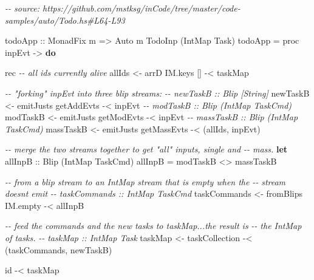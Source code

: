 \documentclass[]{article}
\newenvironment{Shaded}{}{}
\newcommand{\CommentTok}[1]{\textcolor[rgb]{0.38,0.63,0.69}{\textit{#1}}}
\newcommand{\DataTypeTok}[1]{\textcolor[rgb]{0.56,0.13,0.00}{#1}}
\newcommand{\FunctionTok}[1]{\textcolor[rgb]{0.02,0.16,0.49}{#1}}
\newcommand{\KeywordTok}[1]{\textcolor[rgb]{0.00,0.44,0.13}{\textbf{#1}}}
\newcommand{\NormalTok}[1]{#1}
\newcommand{\OperatorTok}[1]{\textcolor[rgb]{0.40,0.40,0.40}{#1}}
\newcommand{\OtherTok}[1]{\textcolor[rgb]{0.00,0.44,0.13}{#1}}
\begin{document}
\begin{Shaded}
\begin{Highlighting}[]
\CommentTok{{-}{-} source: https://github.com/mstksg/inCode/tree/master/code{-}samples/auto/Todo.hs\#L64{-}L93}

\OtherTok{todoApp ::} \DataTypeTok{MonadFix}\NormalTok{ m }\OtherTok{=\textgreater{}} \DataTypeTok{Auto}\NormalTok{ m }\DataTypeTok{TodoInp}\NormalTok{ (}\DataTypeTok{IntMap} \DataTypeTok{Task}\NormalTok{)}
\NormalTok{todoApp }\OtherTok{=}\NormalTok{ proc inpEvt }\OtherTok{{-}\textgreater{}} \KeywordTok{do}

\NormalTok{    rec }\CommentTok{{-}{-} all id\textquotesingle{}s currently alive}
\NormalTok{        allIds }\OtherTok{\textless{}{-}}\NormalTok{ arrD IM.keys [] }\OperatorTok{{-}\textless{}}\NormalTok{ taskMap}

        \CommentTok{{-}{-} "forking" \textasciigrave{}inpEvt\textasciigrave{} into three blip streams:}
        \CommentTok{{-}{-} newTaskB :: Blip [String]}
\NormalTok{        newTaskB  }\OtherTok{\textless{}{-}}\NormalTok{ emitJusts getAddEvts  }\OperatorTok{{-}\textless{}}\NormalTok{ inpEvt}
        \CommentTok{{-}{-} modTaskB :: Blip (IntMap TaskCmd)}
\NormalTok{        modTaskB  }\OtherTok{\textless{}{-}}\NormalTok{ emitJusts getModEvts  }\OperatorTok{{-}\textless{}}\NormalTok{ inpEvt}
        \CommentTok{{-}{-} massTaskB :: Blip (IntMap TaskCmd)}
\NormalTok{        massTaskB }\OtherTok{\textless{}{-}}\NormalTok{ emitJusts getMassEvts }\OperatorTok{{-}\textless{}}\NormalTok{ (allIds, inpEvt)}

        \CommentTok{{-}{-} merge the two streams together to get "all" inputs, single and}
        \CommentTok{{-}{-} mass.}
        \KeywordTok{let}\OtherTok{ allInpB ::} \DataTypeTok{Blip}\NormalTok{ (}\DataTypeTok{IntMap} \DataTypeTok{TaskCmd}\NormalTok{)}
\NormalTok{            allInpB }\OtherTok{=}\NormalTok{ modTaskB }\OperatorTok{\textless{}\textgreater{}}\NormalTok{ massTaskB}

        \CommentTok{{-}{-} from a blip stream to an \textasciigrave{}IntMap\textasciigrave{} stream that is empty when the}
        \CommentTok{{-}{-} stream doesn\textquotesingle{}t emit}
        \CommentTok{{-}{-} taskCommands :: IntMap TaskCmd}
\NormalTok{        taskCommands }\OtherTok{\textless{}{-}}\NormalTok{ fromBlips IM.empty }\OperatorTok{{-}\textless{}}\NormalTok{ allInpB}

        \CommentTok{{-}{-} feed the commands and the new tasks to \textasciigrave{}taskMap\textasciigrave{}...the result is}
        \CommentTok{{-}{-} the \textasciigrave{}IntMap\textasciigrave{} of tasks.}
        \CommentTok{{-}{-} taskMap :: IntMap Task}
\NormalTok{        taskMap }\OtherTok{\textless{}{-}}\NormalTok{ taskCollection }\OperatorTok{{-}\textless{}}\NormalTok{ (taskCommands, newTaskB)}

    \FunctionTok{id} \OperatorTok{{-}\textless{}}\NormalTok{ taskMap}
\end{Highlighting}
\end{Shaded}
\end{document}
